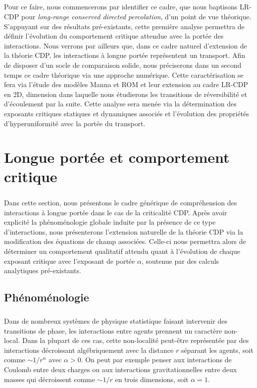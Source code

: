 \subparagraph{}Pour ce faire, nous commencerons par identifier ce cadre, que nous baptisons LR-CDP pour \textit{long-range conserved directed percolation}, d'un point de vue théorique. S'appuyant sur des résultats pré-existants, cette première analyse permettra de définir l'évolution du comportement critique attendue avec la portée des interactions. Nous verrons par ailleurs que, dans ce cadre naturel d'extension de la théorie CDP, les interactions à longue portée représentent un transport. Afin de disposer d'un socle de comparaison solide, nous préciserons dans un second temps ce cadre théorique via une approche numérique. Cette caractérisation se fera via l'étude des modèles Manna et ROM et leur extension au cadre LR-CDP en 2D, dimension dans laquelle nous étudierons les transitions de réversibilité et d'écoulement par la suite. Cette analyse sera menée via la détermination des exposants critiques statiques et dynamiques associés et l'évolution des propriétés d'hyperuniformité avec la portée du transport.

\section{Longue portée et comportement critique}

\subparagraph{}Dans cette section, nous présentons le cadre générique de compréhension des interactions à longue portée dans le cas de la criticalité CDP. Après avoir explicité la phénoménologie globale induite par la présence de ce type d'interactions, nous présenterons l'extension naturelle de la théorie CDP via la modification des équations de champ associées. Celle-ci nous permettra alors de déterminer un comportement qualitatif attendu quant à l'évolution de chaque exposant critique avec l'exposant de portée $\alpha$, soutenue par des calculs analytiques pré-existants.

\label{sec:LRCanonique}

\subsection{Phénoménologie}

\subparagraph{}Dans de nombreux systèmes de physique statistique faisant intervenir des transitions de phase, les interactions entre agents prennent un caractère non-local. Dans la plupart de ces cas, cette non-localité peut-être représentée par des interactions décroissant algébriquement avec la distance $r$ séparant les agents, soit comme $\sim 1/r^\alpha$ avec $\alpha >0$. On peut par exemple penser aux interactions de Coulomb entre deux charges ou aux interactions gravitationnelles entre deux masses qui décroissent comme $\sim 1/r$ en trois dimensions, soit $\alpha = 1$. 

